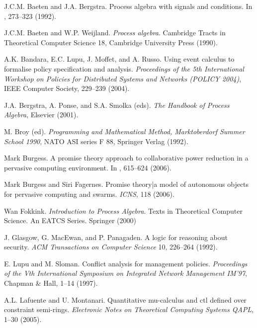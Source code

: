 \documentclass{pseudoelsart}
\begin{document}
\begin{thebibliography}{99}

J.C.M. Baeten and J.A. Bergstra.
\newblock Process algebra with signals and conditions.
\newblock In \cite{B92}, 273--323 (1992).

J.C.M. Baeten and W.P. Weijland.
\newblock \emph{Process algebra}.
\newblock Cambridge Tracts in Theoretical Computer Science 18, Cambridge University Press (1990).

A.K. Bandara, E.C. Lupu, J. Moffet, and A. Russo.
\newblock Using event calculus to formalise policy specification and analysis.
\newblock \emph{Proceedings of the 5th International Workshop on Policies
for Distributed Systems and Networks (POLICY 2004)}, IEEE Computer Society, 229--239 (2004).
 
J.A. Bergstra, A. Ponse, and S.A. Smolka (eds).
\emph{The Handbook of Process Algebra}, Elsevier (2001).

M. Broy (ed).
\newblock \emph{Programming and Mathematical Method, Marktoberdorf Summer School 1990},
NATO ASI series F 88, Springer Verlag (1992).

Mark Burgess.
\newblock A promise theory approach to collaborative power reduction in a pervasive computing
environment.
\newblock In \cite{MJYT06}, 615--624 (2006).

Mark Burgess and Siri Fagernes.
\newblock Promise theory|a model of autonomous objects for pervasive computing and swarms.
\newblock \emph{ICNS}, 118 (2006).

Wan Fokkink.
\newblock \emph{Introduction to Process Algebra}.
\newblock Texts in Theoretical Computer Science. An EATCS Series. Springer (2000)

J. Glasgow, G. MacEwan, and P. Panagaden.
\newblock A logic for reasoning about security.
\newblock \emph{ACM Transactions on Computer Science} 10, 226--264 (1992).

E. Lupu and M. Sloman.
\newblock Conflict analysis for management policies.
\newblock \emph{Proceedings of the Vth International Symposium on Integrated
Network Management IM'97}, Chapman \& Hall, 1--14 (1997).

A.L. Lafuente and U. Montanari.
\newblock Quantitative mu-calculus and ctl defined over constraint semi-rings.
\newblock \emph{Electronic Notes on Theoretical Computing Systems QAPL}, 
1--30 (2005).


\end{thebibliography}
\end{document}
